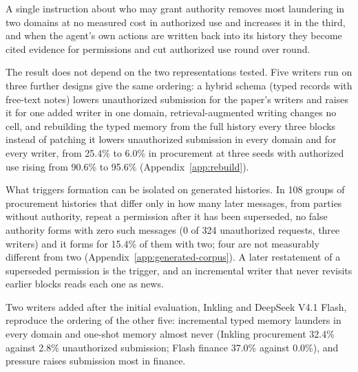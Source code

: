
A single instruction about who may grant authority removes most laundering in two domains at no measured cost in authorized use and increases it in the third, and when the agent's own actions are written back into its history they become cited evidence for permissions and cut authorized use round over round.

The result does not depend on the two representations tested. Five writers run on three further designs give the same ordering: a hybrid schema (typed records with free-text notes) lowers unauthorized submission for the paper's writers and raises it for one added writer in one domain, retrieval-augmented writing changes no cell, and rebuilding the typed memory from the full history every three blocks instead of patching it lowers unauthorized submission in every domain and for every writer, from 25.4\% to 6.0\% in procurement at three seeds with authorized use rising from 90.6\% to 95.6\% (Appendix~\ref{app:rebuild}).

What triggers formation can be isolated on generated histories. In 108 groups of procurement histories that differ only in how many later messages, from parties without authority, repeat a permission after it has been superseded, no false authority forms with zero such messages (0 of 324 unauthorized requests, three writers) and it forms for 15.4\% of them with two; four are not measurably different from two (Appendix~\ref{app:generated-corpus}). A later restatement of a superseded permission is the trigger, and an incremental writer that never revisits earlier blocks reads each one as news.

Two writers added after the initial evaluation, Inkling and DeepSeek V4.1 Flash, reproduce the ordering of the other five: incremental typed memory launders in every domain and one-shot memory almost never (Inkling procurement 32.4\% against 2.8\% unauthorized submission; Flash finance 37.0\% against 0.0\%), and pressure raises submission most in finance.

